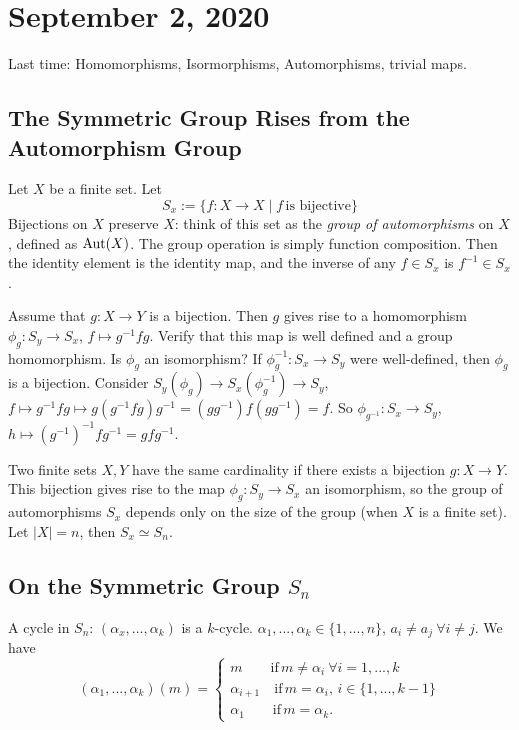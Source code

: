 \section{September 2, 2020}
Last time: Homomorphisms, Isormorphisms, Automorphisms, trivial maps.
\subsection{The Symmetric Group Rises from the Automorphism Group}
\begin{example}
    Let $X$ be a finite set. Let \[
        S_x := \{ f \colon X \to X  \mid f \, \text{is bijective}\} 
    \]
    Bijections on $X$ preserve $X$: think of this set as the \emph{group of automorphisms} on $X$, defined as $\operatorname{Aut}(X)$. The group operation is simply function composition. Then the identity element is the identity map, and the inverse of any $f\in S_x$ is $f^{-1}\in S_x$.
\end{example}
Assume that $ g \colon X \to Y$ is a bijection. Then $g$ gives rise to a homomorphism $ \phi_g \colon S_y \to S_x$, $f \mapsto g^{-1}fg$. Verify that this map is well defined and a group homomorphism. Is $\phi_g$ an isomorphism? If $\phi_g^{-1} \colon S_x \to S_y$ were well-defined, then $\phi_g$ is a bijection. Consider $S_y (\phi_g) \to S_x (\phi_g^{-1}) \to S_y$, $f \mapsto g^{-1}fg \mapsto g(g^{-1}fg)g^{-1}=(gg^{-1})f(gg^{-1})=f$. So $\phi_{g^{-1}} \colon S_{x} \to S_{y}$, $h \mapsto (g^{-1})^{-1}fg^{-1}=gfg^{-1}$.

\begin{conclusion}
    Two finite sets $X,Y$ have the same cardinality if there exists a bijection $ g \colon X \to Y$. This bijection gives rise to the map $ \phi_g \colon S_y \to S_x$ an isomorphism, so the group of automorphisms $S_x$ depends only on the size of the group (when $X$ is a finite set). Let $|X|=n$, then $S_x \simeq S_n$.
\end{conclusion}

\subsection{On the Symmetric Group $S_n$}
A cycle in $S_n$: $(\alpha_x , ... , \alpha_k)$ is a $k$-cycle. $\alpha_1 ,...,\alpha_k \in \{1, ...,n\} $, $a_i \neq a_j \ \forall i \neq j$. We have  
\begin{equation*}
    (\alpha_1,...,\alpha_k)(m) = 
\begin{cases}
    m \qquad \mbox{if}\, m \neq \alpha_i \ \forall i=1,...,k\\
    \alpha_{i+1} \quad \mbox{if} \, m=\alpha_i, \, i\in \{1,...,k-1\} \\
    \alpha_1 \qquad \mbox{if} \, m=\alpha_k.

\end{cases}
\end{equation*}

